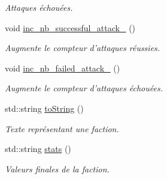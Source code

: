\begin{DoxyCompactItemize}
\begin{DoxyCompactList}\small\item\em Attaques échouées. \end{DoxyCompactList}\item 
\hypertarget{classFaction_a3d92bdbf463e4bd24824d058d58966f4}{void \hyperlink{classFaction_a3d92bdbf463e4bd24824d058d58966f4}{inc\-\_\-nb\-\_\-successful\-\_\-attack\-\_\-} ()}\label{classFaction_a3d92bdbf463e4bd24824d058d58966f4}

\begin{DoxyCompactList}\small\item\em Augmente le compteur d'attaques réussies. \end{DoxyCompactList}\item 
\hypertarget{classFaction_a29fcb8a676a70b4d0981546bf928bf73}{void \hyperlink{classFaction_a29fcb8a676a70b4d0981546bf928bf73}{inc\-\_\-nb\-\_\-failed\-\_\-attack\-\_\-} ()}\label{classFaction_a29fcb8a676a70b4d0981546bf928bf73}

\begin{DoxyCompactList}\small\item\em Augmente le compteur d'attaques échouées. \end{DoxyCompactList}\item 
std\-::string \hyperlink{classFaction_a75e7b414c89b8a4d75bf4a778e844b74}{to\-String} ()
\begin{DoxyCompactList}\small\item\em Texte représentant une faction. \end{DoxyCompactList}\item 
std\-::string \hyperlink{classFaction_abeb8f041bf5e72dca0ce5166528d66ac}{stats} ()
\begin{DoxyCompactList}\small\item\em Valeurs finales de la faction. \end{DoxyCompactList}\end{DoxyCompactItemize}
